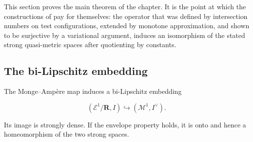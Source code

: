 This section proves the main theorem of the chapter.  It is the point at
which the constructions of  pay
for themselves: the operator that was defined by intersection numbers on
test configurations, extended by monotone approximation, and shown to be
surjective by a variational argument, induces an isomorphism of
the stated strong quasi-metric spaces after quotienting by constants.

\subsection{The bi-Lipschitz embedding}
\label{sec:ch48-bilipschitz}

\begin{proposition}\label{prop:bj-ma-strong-embedding}
The Monge--Amp\`ere map induces a bi-Lipschitz embedding

\[
 (\mathcal E^1/\mathbf R,I)\hookrightarrow
             (\mathcal M^1,I^\vee).
\tag{48.5}\label{eq:bj-ma-bilipschitz}
\]

Its image is strongly dense.  If the envelope property holds, it is onto
and hence a homeomorphism of the two strong spaces.
\end{proposition}


